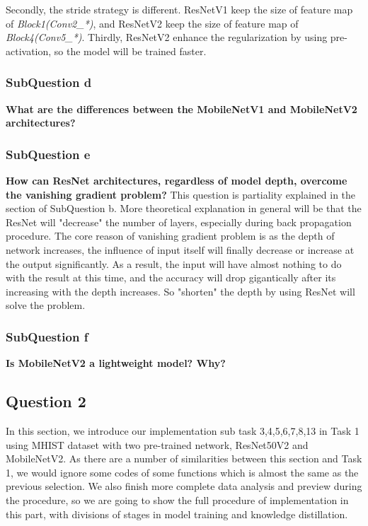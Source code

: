 \documentclass[conference]{IEEEtran}
\begin{document}
Secondly, the stride strategy is different. ResNetV1 keep the size of feature map of \textit{Block1(Conv2\_*)}, and ResNetV2 keep the size of feature map of \textit{Block4(Conv5\_*)}. Thirdly, ResNetV2 enhance the regularization by using pre-activation, so the model will be trained faster.

\subsubsection{SubQuestion d} \textbf{What are the differences between the MobileNetV1 and MobileNetV2 architectures?}

\subsubsection{SubQuestion e} \textbf{How can ResNet architectures, regardless of model depth, overcome the vanishing gradient problem?}
This question is partiality explained in the section of SubQuestion b. More theoretical explanation in general will be that the ResNet will "decrease" the number of layers, especially during back propagation procedure. The core reason of vanishing gradient problem is as the depth of network increases, the influence of input itself will finally decrease or increase at the output significantly. As a result, the input will have almost nothing to do with the result at this time, and the accuracy will drop gigantically after its increasing with the depth increases. So "shorten" the depth by using ResNet will solve the problem.

\subsubsection{SubQuestion f} \textbf{Is MobileNetV2 a lightweight model? Why?}

\subsection{Question 2} In this section, we introduce our implementation sub task 3,4,5,6,7,8,13 in Task 1 using MHIST dataset with two pre-trained network, ResNet50V2 and MobileNetV2. As there are a number of similarities between this section and Task 1, we would ignore some codes of some functions which is almost the same as the previous selection. We also finish more complete data analysis and preview during the procedure, so we are going to show the full procedure of implementation in this part, with divisions of stages in model training and knowledge distillation.
\end{document}
